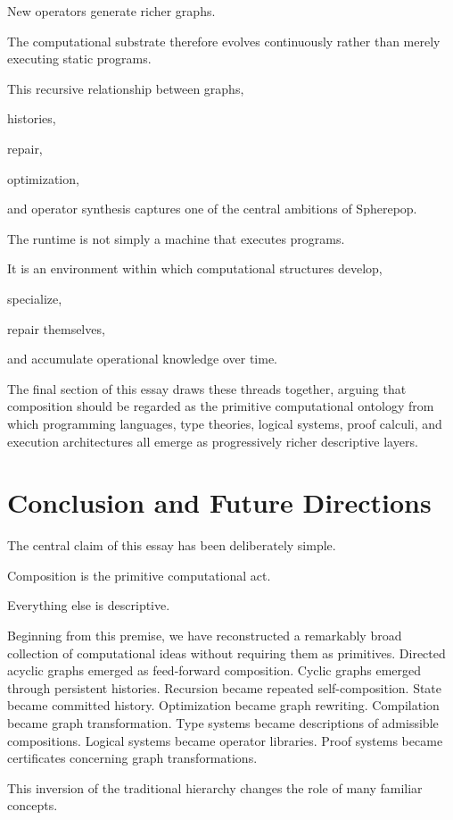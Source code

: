 \documentclass[12pt,oneside]{article}
\begin{document}
New operators generate richer graphs.

The computational substrate therefore evolves continuously rather than merely executing static programs.

This recursive relationship between graphs,

histories,

repair,

optimization,

and operator synthesis captures one of the central ambitions of Spherepop.

The runtime is not simply a machine that executes programs.

It is an environment within which computational structures develop,

specialize,

repair themselves,

and accumulate operational knowledge over time.

The final section of this essay draws these threads together, arguing that composition should be regarded as the primitive computational ontology from which programming languages, type theories, logical systems, proof calculi, and execution architectures all emerge as progressively richer descriptive layers.

\section{Conclusion and Future Directions}

The central claim of this essay has been deliberately simple.

Composition is the primitive computational act.

Everything else is descriptive.

Beginning from this premise, we have reconstructed a remarkably broad collection of computational ideas without requiring them as primitives. Directed acyclic graphs emerged as feed-forward composition. Cyclic graphs emerged through persistent histories. Recursion became repeated self-composition. State became committed history. Optimization became graph rewriting. Compilation became graph transformation. Type systems became descriptions of admissible compositions. Logical systems became operator libraries. Proof systems became certificates concerning graph transformations.

This inversion of the traditional hierarchy changes the role of many familiar concepts.
\end{document}
